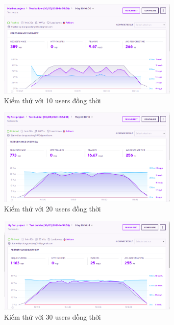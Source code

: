        \begin{figure}[!ht]
			\includegraphics[width=0.8\textwidth]{Images/testing/testing_10.png}
			\centering
			\linebreak
			\caption{Kiểm thử với 10 users đồng thời}
		\end{figure}
	\newpage
		\begin{figure}[!ht]
			\includegraphics[width=0.8\textwidth]{Images/testing/testing_20.png}
			\centering
			\linebreak
			\caption{Kiểm thử với 20 users đồng thời}
		\end{figure}
		\newpage
		\begin{figure}[!ht]
			\includegraphics[width=0.8\textwidth]{Images/testing/testing_30.png}
			\centering
			\linebreak
			\caption{Kiểm thử với 30 users đồng thời}
		\end{figure}
